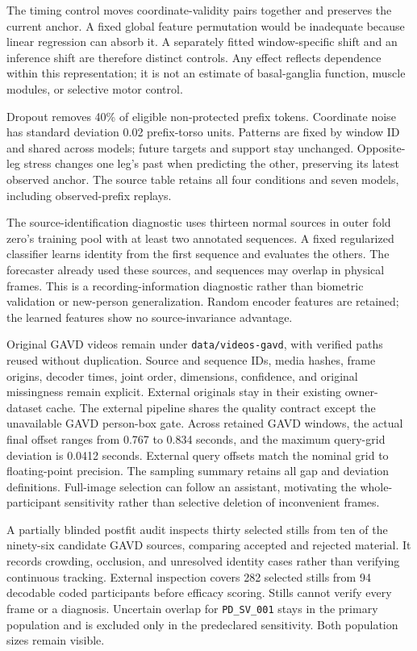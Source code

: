\documentclass[letterpaper]{article}
\begin{document}
The timing control moves coordinate-validity pairs together and preserves the current anchor. A fixed global feature permutation would be inadequate because linear regression can absorb it. A separately fitted window-specific shift and an inference shift are therefore distinct controls. Any effect reflects dependence within this representation; it is not an estimate of basal-ganglia function, muscle modules, or selective motor control.

Dropout removes 40\% of eligible non-protected prefix tokens. Coordinate noise has standard deviation 0.02 prefix-torso units. Patterns are fixed by window ID and shared across models; future targets and support stay unchanged. Opposite-leg stress changes one leg's past when predicting the other, preserving its latest observed anchor. The source table retains all four conditions and seven models, including observed-prefix replays.

The source-identification diagnostic uses thirteen normal sources in outer fold zero's training pool with at least two annotated sequences. A fixed regularized classifier learns identity from the first sequence and evaluates the others. The forecaster already used these sources, and sequences may overlap in physical frames. This is a recording-information diagnostic rather than biometric validation or new-person generalization. Random encoder features are retained; the learned features show no source-invariance advantage.

Original GAVD videos remain under \texttt{data/videos-gavd}, with verified paths reused without duplication. Source and sequence IDs, media hashes, frame origins, decoder times, joint order, dimensions, confidence, and original missingness remain explicit. External originals stay in their existing owner-dataset cache. The external pipeline shares the quality contract except the unavailable GAVD person-box gate. Across retained GAVD windows, the actual final offset ranges from 0.767 to 0.834 seconds, and the maximum query-grid deviation is 0.0412 seconds. External query offsets match the nominal grid to floating-point precision. The sampling summary retains all gap and deviation definitions. Full-image selection can follow an assistant, motivating the whole-participant sensitivity rather than selective deletion of inconvenient frames.

A partially blinded postfit audit inspects thirty selected stills from ten of the ninety-six candidate GAVD sources, comparing accepted and rejected material. It records crowding, occlusion, and unresolved identity cases rather than verifying continuous tracking. External inspection covers 282 selected stills from 94 decodable coded participants before efficacy scoring. Stills cannot verify every frame or a diagnosis. Uncertain overlap for \texttt{PD\_SV\_001} stays in the primary population and is excluded only in the predeclared sensitivity. Both population sizes remain visible.
\end{document}
